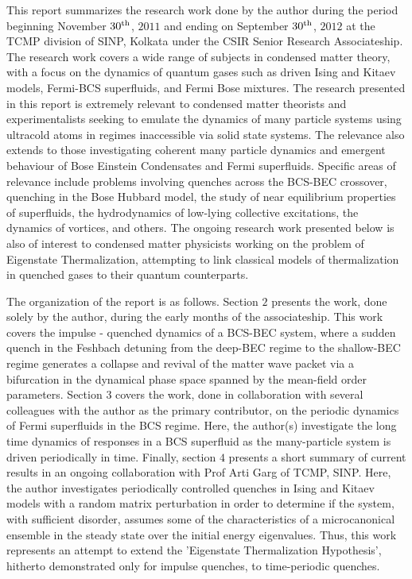 \documentclass[a4paper,10pt]{report}
\begin{document}
This report summarizes the research work done by the author during the period beginning November $30^{\rm th}$, $2011$ and ending on September $30^{\rm th}$, $2012$ at the TCMP division of SINP, Kolkata under the CSIR Senior Research Associateship. The research work covers a wide range of subjects in condensed matter theory, with a focus on the dynamics of quantum gases such as driven Ising and Kitaev models, Fermi-BCS superfluids, and Fermi Bose mixtures. The research presented in this report is extremely relevant to condensed matter theorists and experimentalists seeking to emulate the dynamics of many particle systems using ultracold atoms in regimes inaccessible via solid state systems. The relevance also extends to those investigating coherent many particle dynamics and emergent behaviour of Bose Einstein Condensates and Fermi superfluids. Specific areas of relevance include problems involving quenches across the BCS-BEC crossover, quenching in the Bose Hubbard model, the study of near equilibrium 
properties of superfluids, the hydrodynamics of low-lying collective excitations, the dynamics of vortices, and others. The ongoing research work presented below is also of interest to condensed matter physicists working on the problem of Eigenstate Thermalization, attempting to link classical models of thermalization in quenched gases
to their quantum counterparts.

The organization of the report is as follows. Section $2$ presents the work, done solely by the author, during the early months of the associateship. This work covers the impulse - quenched dynamics of a BCS-BEC system, where a sudden quench in the Feshbach detuning from the deep-BEC regime to the shallow-BEC regime generates a collapse and revival of the matter wave packet via a bifurcation in the dynamical phase space spanned by the mean-field order parameters. Section $3$ covers the work, done in collaboration with several colleagues with the author as the primary contributor, on the periodic dynamics of Fermi superfluids in the BCS regime. Here, the author(s) investigate the long time dynamics of responses in a BCS superfluid as the many-particle system is driven periodically in time. Finally, section $4$ presents a short summary of current results in an ongoing collaboration with Prof Arti Garg of TCMP, SINP. Here, the author investigates periodically controlled quenches in Ising and Kitaev models with 
a random matrix perturbation in order to determine if the system, with sufficient disorder, assumes some of the characteristics of a microcanonical ensemble in the steady state over the initial energy eigenvalues. Thus, this work represents an attempt to extend the  'Eigenstate Thermalization Hypothesis', hitherto demonstrated only for impulse quenches, to time-periodic quenches.
\end{document}
